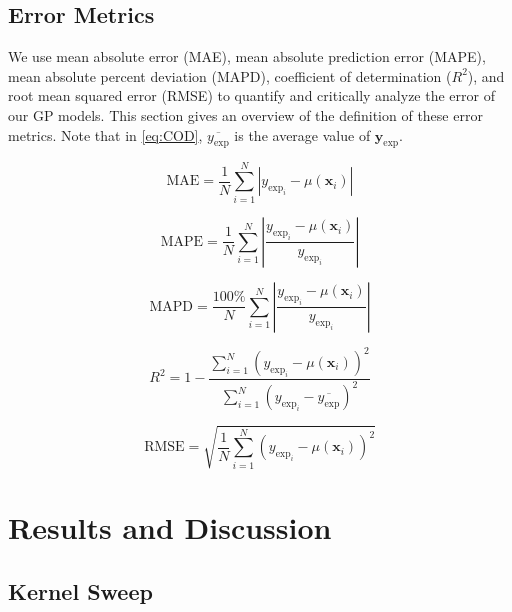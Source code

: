 \documentclass[journal=jacsat,manuscript=article]{achemso}
\begin{document}
\subsection{Error Metrics}
We use mean absolute error (MAE), mean absolute prediction error (MAPE), mean absolute percent deviation (MAPD), coefficient of determination ($R^2$), and root mean squared error (RMSE) to quantify and critically analyze the error of our GP models. This section gives an overview of the definition of these error metrics. Note that in \eqref{eq:COD}, $\overline{y_{\text{exp}}}$ is the average value of $\mathbf{y}_{\text{exp}}$. 

\begin{equation}
    \text{MAE} = \frac{1}{N} \sum_{i=1}^{N} \left| y_{\text{exp}_i} - \mu(\mathbf{x}_i) \right|
    \label{eq:MAE}
\end{equation}

\begin{equation}
    \text{MAPE} = \frac{1}{N} \sum_{i=1}^{N} \left| \frac{y_{\text{exp}_i} - \mu(\mathbf{x}_i)}{y_{\text{exp}_i}} \right|
    \label{eq:MAPE}
\end{equation}

\begin{equation}
    \text{MAPD} = \frac{100\%}{N} \sum_{i=1}^{N} \left| \frac{y_{\text{exp}_i} - \mu(\mathbf{x}_i)}{y_{\text{exp}_i}} \right|
    \label{eq:MAPD}
\end{equation}

\begin{equation}
    R^2 = 1 - \frac{\sum_{i=1}^{N} \left( y_{\text{exp}_i} - \mu(\mathbf{x}_i) \right)^2}{\sum_{i=1}^{N} \left( y_{\text{exp}_i} - \overline{y_{\text{exp}}} \right)^2}
    \label{eq:COD}
\end{equation}

\begin{equation}
    \text{RMSE} = \sqrt{\frac{1}{N} \sum_{i=1}^{N} \left( y_{\text{exp}_i} - \mu(\mathbf{x}_i) \right)^2}
    \label{eq:RMSE}
\end{equation}

\section{Results and Discussion}


\subsection{Kernel Sweep} 
\label{sec:kern_sweep}
\end{document}
